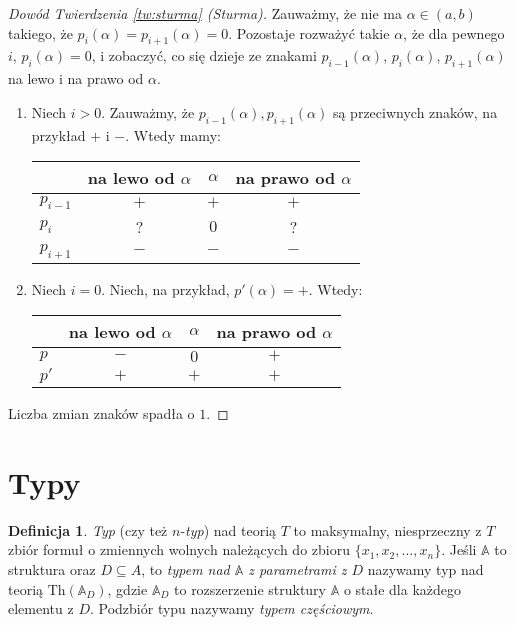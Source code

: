 \documentclass{article}
\newcommand{\A}{\mathbb{A}}
\theoremstyle{plain}
\theoremstyle{definition}
\newtheorem{df}[thm]{Definicja}
\theoremstyle{remark}
\newcommand{\Th}{\text{Th}}
\begin{document}
\begin{proof}[Dowód Twierdzenia \ref{tw:sturma} (Sturma)]
	Zauważmy, że nie ma $\alpha \in (a, b)$ takiego, że
	$p_i(\alpha) = p_{i+1}(\alpha) = 0$. Pozostaje rozważyć takie $\alpha$,
	że dla pewnego $i$, $p_i(\alpha) = 0$, i zobaczyć, co się dzieje ze
	znakami $p_{i-1}(\alpha)$, $p_{i}(\alpha)$, $p_{i+1}(\alpha)$ na lewo
	i na prawo od $\alpha$.
	\begin{enumerate}
		\item Niech $i > 0$. Zauważmy, że
			$p_{i-1}(\alpha) , p_{i+1}(\alpha)$ są przeciwnych
			znaków, na przykład $+$ i $-$. Wtedy mamy:
			\begin{table}[!htbp] \centering
			\begin{tabular}{l|ccc}
			&na lewo od $\alpha$ & $\alpha$ & na prawo od $\alpha$ \\
				\hline
			$p_{i-1}$ & $+$ & $+$ & $+$ \\
			$p_{i}$ & ? & $0$ & ? \\
			$p_{i+1}$ & $-$ & $-$ & $-$
			\end{tabular}
			\end{table}
		\item Niech $i = 0$. Niech, na przykład, $p'(\alpha) = +$. Wtedy:
			\begin{table}[!htbp] \centering
			\begin{tabular}{l|ccc}
			&na lewo od $\alpha$ & $\alpha$ &na prawo od $\alpha$ \\
				\hline
			$p$ & $-$ & $0$ & $+$ \\
			$p'$ & $+$ & $+$ & $+$
			\end{tabular}
			\end{table}
	\end{enumerate}
	Liczba zmian znaków spadła o $1$.
\end{proof}

\section{Typy}

\begin{df}
	\textit{Typ} (czy też $n$-\textit{typ}) nad teorią $T$ to maksymalny, niesprzeczny z $T$ zbiór formuł o zmiennych wolnych należących do zbioru $\{x_1, x_2, \ldots, x_n\}$.
		Jeśli $\A$ to struktura oraz $D \subseteq A$, to \textit{typem nad $\A$ z parametrami z $D$} nazywamy typ nad teorią $\Th(\A_D)$, gdzie $\A_D$ to rozszerzenie struktury $\A$ o stałe dla każdego elementu z $D$.
		Podzbiór typu nazywamy \textit{typem częściowym}.
\end{df}
\end{document}
